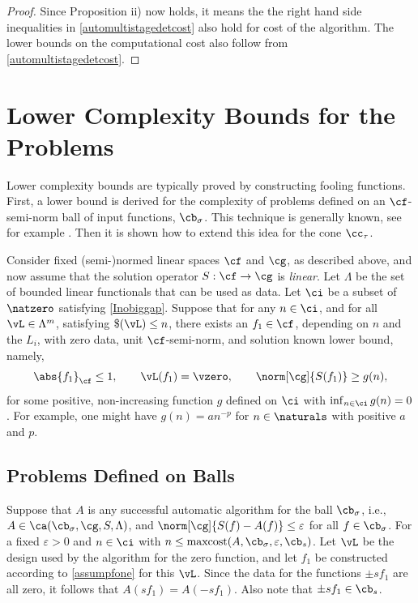 \documentclass[]{elsarticle}
\DeclareMathOperator{\maxcost}{maxcost}
\theoremstyle{definition}
\theoremstyle{remark}
\newcommand{\Fnorm}[1]{\abs{#1}_{\cf}}
\newcommand{\Gnorm}[1]{\norm[\cg]{#1}}
\begin{document}
\begin{proof}
Since Proposition ii) now holds, it means the the right hand side inequalities in \eqref{automultistagedetcost} also hold for cost of the algorithm.  The lower bounds on the computational cost also follow from \eqref{automultistagedetcost}.
\end{proof}


\section{Lower Complexity Bounds for the Problems} \label{LowBoundSec}
Lower complexity bounds are typically proved by constructing fooling functions.  First, a lower bound is derived for the complexity of problems defined on an $\cf$-semi-norm ball of input functions, $\cb_\sigma$.  This technique is generally known, see for example \cite[p.\ 11--12]{TraWer98}.  Then it is shown how to extend this idea for the cone $\cc_{\tau}$.  

Consider fixed (semi-)normed linear spaces $\cf$ and $\cg$, as described above, and now assume that the solution operator $S: \cf \to \cg$ is \emph{linear}.  Let $\Lambda$ be the set of bounded linear functionals that can be used as data. Let $\ci$ be a subset of $\natzero$ satisfying \eqref{Inobiggap}.  Suppose that for any $n \in \ci$, and for all $\vL \in \Lambda^m$, satisfying $\$(\vL)\le n$, there exists an $f_1 \in \cf$, depending on $n$ and the $L_i$, with zero data, unit $\cf$-semi-norm, and solution known lower bound, namely,
\begin{equation} \label{assumpfone}
\Fnorm{f_1} \le 1, \qquad \vL(f_1)= \vzero, \qquad
\norm[\cg]{S(f_1)} \ge g(n), 
\end{equation}
for some positive, non-increasing function $g$ defined on $\ci$ with $\inf_{n \in \ci} g(n)=0$.  For example, one might have $g(n)=a n^{-p}$ for $n \in \naturals$ with positive $a$ and $p$.

\subsection{Problems Defined on Balls} 
Suppose that $A$ is any successful automatic algorithm for the ball $\cb_{\sigma}$, i.e., $A \in \ca(\cb_{\sigma},\cg,S,\Lambda)$, and $\Gnorm{S(f)-A(f)}\le \varepsilon$ for all $f \in \cb_{\sigma}$.  For a fixed $\varepsilon>0$ and $n \in \ci$ with $n \le \maxcost(A,\cb_{\sigma},\varepsilon,\cb_{s})$.  Let $\vL$ be the design used by the algorithm for the zero function, and let $f_1$ be constructed according to \eqref{assumpfone} for this $\vL$.  Since the data for the functions $\pm s f_1$ are all zero, it follows that $A(s f_1)=A(-s f_1)$.  Also note that $\pm s f_1 \in \cb_{s}$.
\end{document}

